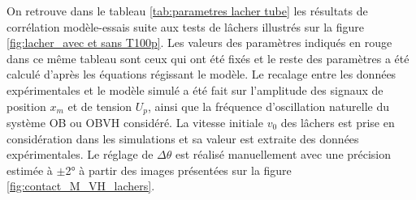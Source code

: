 On retrouve dans le tableau \ref{tab:parametres lacher tube} les résultats de corrélation modèle-essais suite aux tests de lâchers illustrés sur la figure \ref{fig:lacher_avec et sans T100p}. Les valeurs des paramètres indiqués en rouge dans ce même tableau sont ceux qui ont été fixés et le reste des paramètres a été calculé d'après les équations régissant le modèle. Le recalage entre les données expérimentales et le modèle simulé a été fait sur l'amplitude des signaux de position $x_m$ et de tension $U_p$, ainsi que la fréquence d'oscillation naturelle du système OB ou OBVH considéré. La vitesse initiale $v_0$ des lâchers est prise en considération dans les simulations et sa valeur est extraite des données expérimentales. Le réglage de $\Delta\theta$ est réalisé manuellement avec une précision estimée à $\pm$\ang{2} à partir des images présentées sur la figure \ref{fig:contact_M_VH_lachers}.
